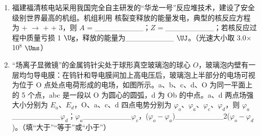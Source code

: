 \documentclass[\gkver]{gaokaozhenti}
\begin{document}
\begin{enumerate}
{ $G\frac{Mm'}{(R+r)^{2}}+G\frac{mm'}{r^{2}}=m'\omega^{2}(r+r_{2})$

再根据选项 AB 分析可知

$Mr_{1}=mr_{2},\ r_{1}+r_{2}=R,$

 $\omega=\left[\frac{G(M+m)}{R^{3}}\right]^{\frac{1}{2}}$

联立解得  $r=\sqrt[3]{\frac{m}{3M+m}}R$

故 C 错误、故 D 正确。

故选 BD。


三、非选择题：共 60 分，其中 9、10、11 为填空题，12、13 为实验题，14～16 为计算题。
}

\item
福建福清核电站采用我国完全自主研发的“华龙一号”反应堆技术，建设了安全级别世界最高的机组。机组利用  核裂变释放的能量发电，典型的核反应方程为 + $\to$  +  + 3，则 $A$ = \_\_\_\_\_\_\_\_\_；$Z$ = \_\_\_\_\_\_\_\_\_；若核反应过程中质量亏损 1 $\Ug$，释放的能量为\_\_\_\_\_\_\_\_\_ $\UJ$。（光速大小取 3.0$\times$10$^{8}$ $\Ums$）

\item
“场离子显微镜”的金属钨针尖处于球形真空玻璃泡的球心 $O$，玻璃泡内壁有一层均匀导电膜：在钨针和导电膜间加上高电压后，玻璃泡上半部分的电场可视为位于 O 点处点电荷形成的电场，如图所示。a、b、c、d、O 为同一平面上的 5 个点，abc 是一段以 O 为圆心的圆弧，d 为 Ob 的中点。a、d 两点场强大小分别为 $E_{a}$、$E_{d}$，O、a、c、d 四点电势分别为 $\varphi_{o}$、$\varphi_{a}$、$\varphi_{c}$、$\varphi_{d}$，则 $\varphi_{a}$\_\_\_\_\_\_\_\_\_$\varphi_{d}$；$\varphi_{a}$\_\_\_\_\_\_\_\_\_$\varphi_{c}$，($\varphi_{o} - \varphi_{a}$)\_\_\_\_\_\_\_\_\_2($\varphi_{o} - \varphi_{d}$)。（填“大于”“等于”或“小于”）
\end{enumerate}
\end{document}

